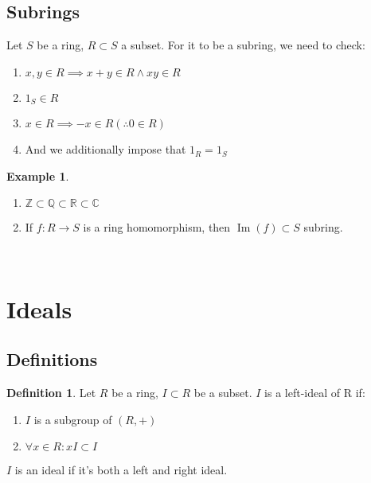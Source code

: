 \documentclass{article}
\newcommand\R{\ensuremath{\mathbb{R}}}
\newcommand\Z{\ensuremath{\mathbb{Z}}}
\newcommand\Q{\ensuremath{\mathbb{Q}}}
\newcommand\C{\ensuremath{\mathbb{C}}}
\DeclareMathOperator{\im}{Im}
\theoremstyle{definition}
\newtheorem{definition}{Definition}[subsection]
\newtheorem{eg}{Example}[subsection]
\theoremstyle{remark}
\theoremstyle{plain}
\begin{document}
\subsection{Subrings}

Let $S$ be a ring, $R\subset S$ a subset. For it to be a subring, we need to check:
\begin{enumerate}
    \item $x,y \in R \implies x+y\in R \land xy \in R$
    \item $1_S \in R$
    \item $x \in R \implies -x \in R (\therefore 0 \in R)$
    \item And we additionally impose that $1_R = 1_S$
\end{enumerate}

\begin{eg}
    \begin{enumerate}
        \item $\Z \subset \Q \subset \R \subset \C$
        \item If $f:R\to S$ is a ring homomorphism, then $\im(f) \subset S$ subring. 
        


        
    \end{enumerate}
    \

\end{eg}

\section{Ideals}
\subsection{Definitions}

\begin{definition}
    Let $R$ be a ring, $I \subset R$ be a subset. $I$ is a left-ideal of R if:
\begin{enumerate}
    \item $I$ is a subgroup of $(R,+)$
    \item $\forall x \in R: xI \subset I$
\end{enumerate} 
$I$ is an ideal if it's both a left and right ideal. 
\end{definition}
\end{document}
